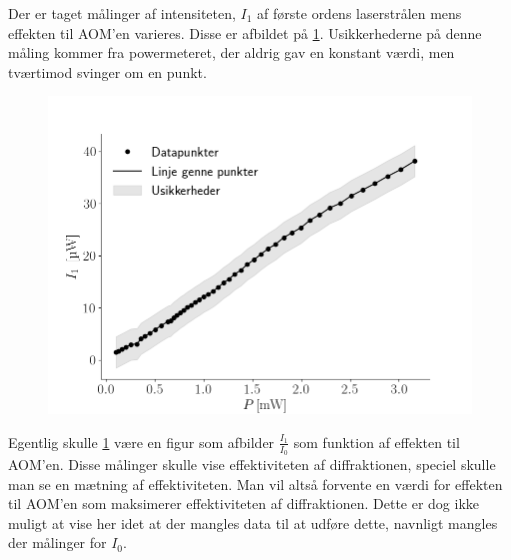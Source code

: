\documentclass[main]{subfiles}
\begin{document}
\bigskip

Der er taget målinger af intensiteten, $I_1$ af første ordens laserstrålen mens effekten til AOM'en varieres. Disse er afbildet på \cref{fig:graf2}. Usikkerhederne på denne måling kommer fra  powermeteret, der aldrig gav en konstant værdi, men tværtimod svinger om en punkt. 

\begin{figure}[H]
    \centering
    \includegraphics[width=\linewidth]{tegninger/graf2.png}
    \caption{}
    \label{fig:graf2}
\end{figure}
Egentlig skulle \cref{fig:graf2} være en figur som afbilder $\frac{I_1}{I_0}$ som funktion af effekten til AOM'en. Disse målinger skulle vise effektiviteten af diffraktionen, speciel skulle man se en mætning af effektiviteten. Man vil altså forvente en værdi for effekten til AOM'en som maksimerer effektiviteten af diffraktionen. Dette er dog ikke muligt at vise her idet at der mangles data til at udføre dette, navnligt mangles der målinger for $I_0$.
\end{document}
